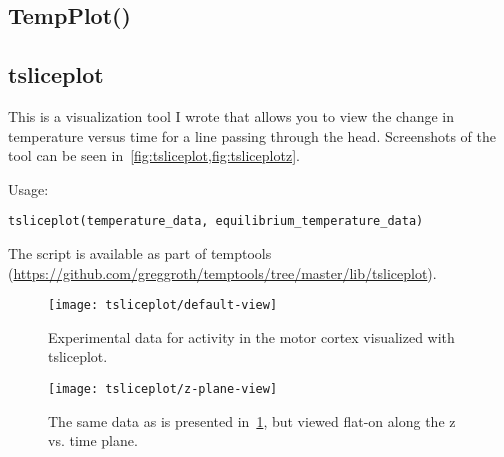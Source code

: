 \subsection{TempPlot()}

\subsection{tsliceplot}
This is a visualization tool I wrote that allows you to view the change in temperature versus time for a line passing through the head.  Screenshots of the tool can be seen in~\cref{fig:tsliceplot,fig:tsliceplotz}.

Usage:
\begin{lstlisting}[style=snippet,label=invoke-tsliceplot]
  tsliceplot(temperature_data, equilibrium_temperature_data)
\end{lstlisting}

The script is available as part of temptools (\url{https://github.com/greggroth/temptools/tree/master/lib/tsliceplot}).

\begin{figure}[hbt]
  \centering
    \caption[Visualization using tsliceplot]{Experimental data for activity in the motor cortex visualized with tsliceplot. \label{fig:tsliceplot}}
    \texttt{[image: tsliceplot/default-view]}
  \centering
\end{figure}

\begin{figure}[hbt]
  \centering
    \caption[Visualization using tsliceplot (z v. t plane)]{The same data as is presented in~\cref{fig:tsliceplot}, but viewed flat-on along the z vs. time plane.\label{fig:tsliceplotz}}
    \texttt{[image: tsliceplot/z-plane-view]}
  \centering
\end{figure}